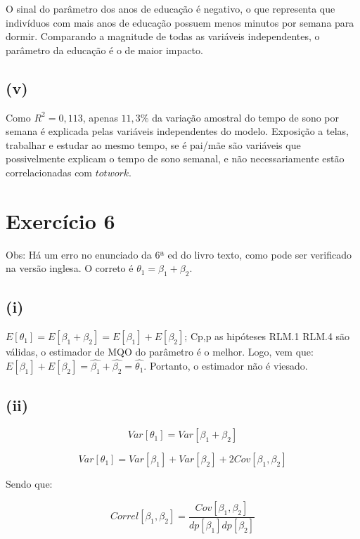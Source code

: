 \documentclass[hidelinks,11pt]{book}
\theoremstyle{definition}
\begin{document}
O sinal do parâmetro dos anos de educação é negativo, o que representa que indivíduos com mais anos de educação possuem menos minutos por semana para dormir. Comparando a magnitude de todas as variáveis independentes, o parâmetro da educação é o de maior impacto.

\subsection*{(v)}

Como $R^2 = 0,113$, apenas $11,3\%$ da variação amostral do tempo de sono por semana é explicada pelas variáveis independentes do modelo. Exposição a telas, trabalhar e estudar ao mesmo tempo, se é pai/mãe são variáveis que possivelmente explicam o tempo de sono semanal, e não necessariamente estão correlacionadas com $totwork$.

\section*{Exercício 6}

Obs: Há um erro no enunciado da 6ª ed do livro texto, como pode ser verificado na versão inglesa. O correto é $\theta_1 = \beta_1 + \beta_2$.

\subsection*{(i)}

$ E[\theta_1] = E[\beta_1 + \beta_2] = E[\beta_1] + E[\beta_2]$; Cp,p as hipóteses RLM.1 RLM.4 são válidas, o estimador de MQO do parâmetro é o melhor. Logo, vem que: $E[\beta_1] + E[\beta_2] = \hat{\beta_1} + \hat{\beta_2} = \hat{\theta_1}$. Portanto, o estimador não é viesado.

\subsection*{(ii)}

\begin{displaymath}
	Var[\theta_1] = Var[\beta_1 + \beta_2]
\end{displaymath}

\begin{displaymath}
	Var[\theta_1] = Var[\beta_1] + Var[\beta_2] + 2Cov[\beta_1, \beta_2]
\end{displaymath}

Sendo que:

\begin{displaymath}
	Correl[\beta_1, \beta_2] = \frac{Cov[\beta_1, \beta_2]}   {dp[\beta_1]dp[\beta_2]}
\end{displaymath}
\end{document}
